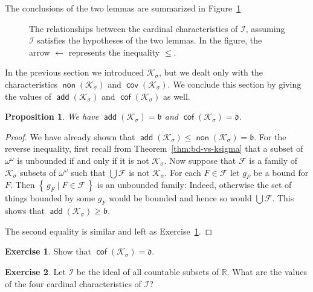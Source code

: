 \documentclass[11pt,oneside]{amsbook}
\newcommand{\set}[1]{\left\{\,#1\,\right\}}
\newcommand{\RR}{\mathbb R}
\newcommand{\Ksigma}{\mathcal K_\sigma}
\DeclareMathOperator{\add}{\mathsf{add}}
\DeclareMathOperator{\non}{\mathsf{non}}
\DeclareMathOperator{\cov}{\mathsf{cov}}
\DeclareMathOperator{\cof}{\mathsf{cof}}
\theoremstyle{definition}
\newtheorem{exerc}{Exercise}[section]
\theoremstyle{plain}
\newtheorem{prop}[thm]{Proposition}
\theoremstyle{definition}
\theoremstyle{remark}
\numberwithin{equation}{section}
\numberwithin{figure}{section}
\begin{document}
The conclusions of the two lemmas are summarized in Figure~\ref{fig:ideal}

\begin{figure}[h]
  \caption{The relationships between the cardinal characteristics of $\mathcal I$, assuming $\mathcal I$ satisfies the hypotheses of the two lemmas. In the figure, the arrow $\leftarrow$ represents the inequality $\leq$.\label{fig:ideal}}
\end{figure}

In the previous section we introduced $\Ksigma$, but we dealt only with the characteristics $\non(\Ksigma)$ and $\cov(\Ksigma)$. We conclude this section by giving the values of $\add(\Ksigma)$ and $\cof(\Ksigma)$ as well.

\begin{prop}
  We have $\add(\Ksigma)=\mathfrak b$ and $\cof(\Ksigma)=\mathfrak d$.
\end{prop}

\begin{proof}
  We have already shown that $\add(\Ksigma)\leq\non(\Ksigma)=\mathfrak b$. For the reverse inequality, first recall from Theorem~\ref{thm:bd-vs-ksigma} that a subset of $\omega^\omega$ is unbounded if and only if it is not $\Ksigma$. Now suppose that $\mathcal F$ is a family of $\Ksigma$ subsets of $\omega^\omega$ such that $\bigcup\mathcal F$ is not $\Ksigma$. For each $F\in\mathcal F$ let $g_F$ be a bound for $F$. Then $\set{g_F\mid F\in\mathcal F}$ is an unbounded family: Indeed, otherwise the set of things bounded by some $g_F$ would be bounded and hence so would $\bigcup\mathcal F$. This shows that $\add(\Ksigma)\geq\mathfrak b$.

The second equality is similar and left as Exercise~\ref{exerc:non-ksigma-d}.
\end{proof}

\begin{exerc}
  \label{exerc:non-ksigma-d}
  Show that $\cof(\Ksigma)=\mathfrak d$.
\end{exerc}

\begin{exerc}
  Let $\mathcal I$ be the ideal of all countable subsets of $\RR$. What are the values of the four cardinal characteristics of $\mathcal I$?
\end{exerc}
\end{document}
